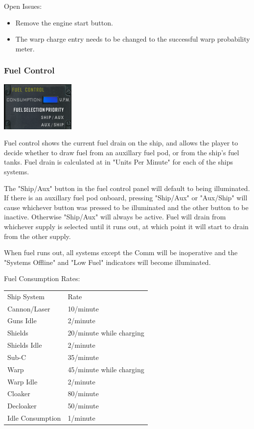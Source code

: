 Open Issues:
\begin{itemize}
\item Remove the engine start button.
\item The warp charge entry needs to be changed to the successful warp
probability meter.
\end{itemize}

\subsubsection{Fuel Control}
\includegraphics[scale=0.70]{images/fuelcontrol.png}

Fuel control shows the current fuel drain on the ship, and allows the player
to decide whether to draw fuel from an auxillary fuel pod, or from the
ship's fuel tanks.  Fuel drain is calculated at in "Units Per Minute" for
each of the ships systems.

The "Ship\slash Aux" button in the fuel control panel will default to
being illuminated.  If there is an auxillary fuel pod onboard, pressing
"Ship\slash Aux" or "Aux\slash Ship" will cause whichever button was
pressed to be illuminated and the other button to be inactive.  Otherwise
"Ship\slash Aux" will always be active.  Fuel will drain from whichever
supply is selected until it runs out, at which point it will start to drain
from the other supply.  

When fuel runs out, all systems except the Comm will be inoperative and
the "Systems Offline" and "Low Fuel" indicators will become illuminated.

Fuel Consumption Rates:

\begin{tabular}{ | l | l | }
\hline
Ship System & Rate \\
Cannon\slash Laser & 10\slash minute \\
Guns Idle & 2\slash minute \\
Shields & 20\slash minute while charging \\
Shields Idle & 2\slash minute \\
Sub-C & 35\slash minute \\
Warp & 45\slash minute while charging \\
Warp Idle & 2\slash minute \\
Cloaker & 80\slash minute \\
Decloaker & 50\slash minute \\
Idle Consumption & 1\slash minute \\
\hline
\end{tabular}

